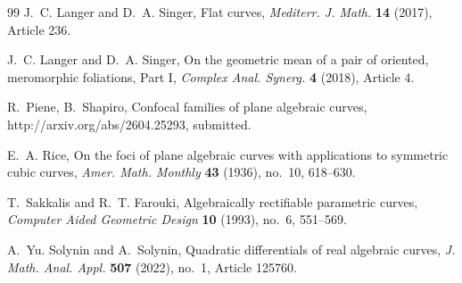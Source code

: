 \documentclass[reqno]{amsart}
\theoremstyle{definition}
\theoremstyle{remark}
\theoremstyle{definition}
\theoremstyle{definition}
\theoremstyle{definition}
\begin{document}
\begin{thebibliography}{99}
 J.~C. Langer and D.~A. Singer, Flat curves, \emph{Mediterr. J. Math.} \textbf{14} (2017), Article 236.

 J.~C. Langer and D.~A. Singer, On the geometric mean of a pair of oriented, meromorphic foliations, Part I, \emph{Complex Anal. Synerg.} \textbf{4} (2018), Article 4.

 R.~Piene, B.~Shapiro, Confocal families of plane algebraic curves, 
http://arxiv.org/abs/2604.25293, submitted.

 E.~A. Rice, On the foci of plane algebraic curves with applications to symmetric cubic curves, \emph{Amer. Math. Monthly} \textbf{43} (1936), no.~10, 618--630.

 T.~Sakkalis and R.~T. Farouki, Algebraically rectifiable parametric curves, \emph{Computer Aided Geometric Design} \textbf{10} (1993), no.~6, 551--569.

 A.~Yu. Solynin and A.~Solynin, Quadratic differentials of real algebraic curves, \emph{J. Math. Anal. Appl.} \textbf{507} (2022), no.~1, Article 125760.

\end{thebibliography}
\end{document}

